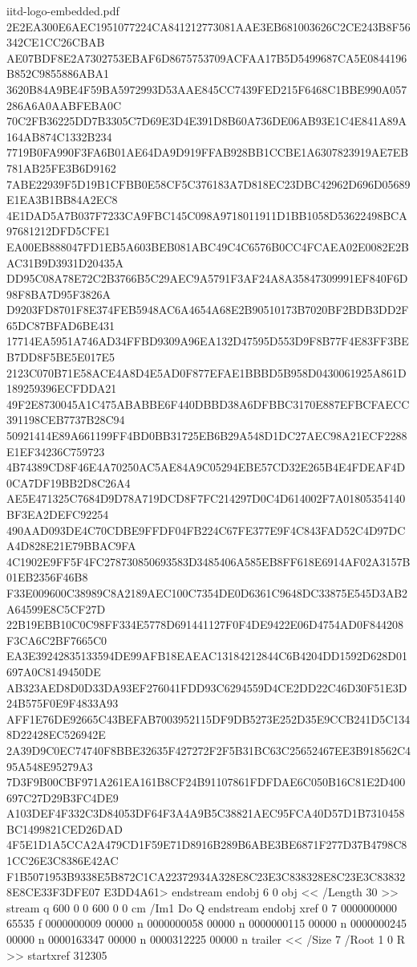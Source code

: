 \begin{filecontents*}[overwrite]{iitd-logo-embedded.pdf}
2E2EA300E6AEC1951077224CA841212773081AAE3EB681003626C2CE243B8F56342CE1CC26CBAB
AE07BDF8E2A7302753EBAF6D8675753709ACFAA17B5D5499687CA5E0844196B852C9855886ABA1
3620B84A9BE4F59BA5972993D53AAE845CC7439FED215F6468C1BBE990A057286A6A0AABFEBA0C
70C2FB36225DD7B3305C7D69E3D4E391D8B60A736DE06AB93E1C4E841A89A164AB874C1332B234
7719B0FA990F3FA6B01AE64DA9D919FFAB928BB1CCBE1A6307823919AE7EB781AB25FE3B6D9162
7ABE22939F5D19B1CFBB0E58CF5C376183A7D818EC23DBC42962D696D05689E1EA3B1BB84A2EC8
4E1DAD5A7B037F7233CA9FBC145C098A9718011911D1BB1058D53622498BCA97681212DFD5CFE1
EA00EB888047FD1EB5A603BEB081ABC49C4C6576B0CC4FCAEA02E0082E2BAC31B9D3931D20435A
DD95C08A78E72C2B3766B5C29AEC9A5791F3AF24A8A35847309991EF840F6D98F8BA7D95F3826A
D9203FD8701F8E374FEB5948AC6A4654A68E2B90510173B7020BF2BDB3DD2F65DC87BFAD6BE431
17714EA5951A746AD34FFBD9309A96EA132D47595D553D9F8B77F4E83FF3BEB7DD8F5BE5E017E5
2123C070B71E58ACE4A8D4E5AD0F877EFAE1BBBD5B958D0430061925A861D189259396ECFDDA21
49F2E8730045A1C475ABABBE6F440DBBD38A6DFBBC3170E887EFBCFAECC391198CEB7737B28C94
50921414E89A661199FF4BD0BB31725EB6B29A548D1DC27AEC98A21ECF2288E1EF34236C759723
4B74389CD8F46E4A70250AC5AE84A9C05294EBE57CD32E265B4E4FDEAF4D0CA7DF19BB2D8C26A4
AE5E471325C7684D9D78A719DCD8F7FC214297D0C4D614002F7A01805354140BF3EA2DEFC92254
490AAD093DE4C70CDBE9FFDF04FB224C67FE377E9F4C843FAD52C4D97DCA4D828E21E79BBAC9FA
4C1902E9FF5F4FC278730850693583D3485406A585EB8FF618E6914AF02A3157B01EB2356F46B8
F33E009600C38989C8A2189AEC100C7354DE0D6361C9648DC33875E545D3AB2A64599E8C5CF27D
22B19EBB10C0C98FF334E5778D691441127F0F4DE9422E06D4754AD0F844208F3CA6C2BF7665C0
EA3E39242835133594DE99AFB18EAEAC13184212844C6B4204DD1592D628D01697A0C8149450DE
AB323AED8D0D33DA93EF276041FDD93C6294559D4CE2DD22C46D30F51E3D24B575F0E9F4833A93
AFF1E76DE92665C43BEFAB7003952115DF9DB5273E252D35E9CCB241D5C1348D22428EC526942E
2A39D9C0EC74740F8BBE32635F427272F2F5B31BC63C25652467EE3B918562C495A548E95279A3
7D3F9B00CBF971A261EA161B8CF24B91107861FDFDAE6C050B16C81E2D400697C27D29B3FC4DE9
A103DEF4F332C3D84053DF64F3A4A9B5C38821AEC95FCA40D57D1B7310458BC1499821CED26DAD
4F5E1D1A5CCA2A479CD1F59E71D8916B289B6ABE3BE6871F277D37B4798C81CC26E3C8386E42AC
F1B5071953B9338E5B872C1CA22372934A328E8C23E3C838328E8C23E3C838328E8CE33F3DFE07
E3DD4A61>
endstream
endobj
6 0 obj
<< /Length 30 >>
stream
q 600 0 0 600 0 0 cm /Im1 Do Q
endstream
endobj
xref
0 7
0000000000 65535 f 
0000000009 00000 n 
0000000058 00000 n 
0000000115 00000 n 
0000000245 00000 n 
0000163347 00000 n 
0000312225 00000 n 
trailer
<< /Size 7 /Root 1 0 R >>
startxref
312305
\end{filecontents*}
